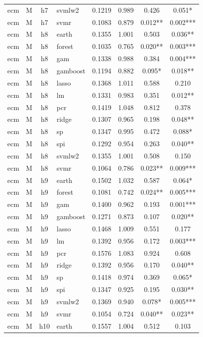 \begin{ThreePartTable}
\begin{longtable}[t]{llclcccc}
ecm & M & h7 & svmlw2 & 0.1219 & 0.989 & 0.426 & 0.051*\\
ecm & M & h7 & svmr & 0.1083 & 0.879 & 0.012** & 0.002***\\
\addlinespace
ecm & M & h8 & earth & 0.1355 & 1.001 & 0.503 & 0.036**\\
ecm & M & h8 & forest & 0.1035 & 0.765 & 0.020** & 0.003***\\
ecm & M & h8 & gam & 0.1338 & 0.988 & 0.384 & 0.004***\\
ecm & M & h8 & gamboost & 0.1194 & 0.882 & 0.095* & 0.018**\\
ecm & M & h8 & lasso & 0.1368 & 1.011 & 0.588 & 0.210\\
ecm & M & h8 & lm & 0.1331 & 0.983 & 0.351 & 0.012**\\
ecm & M & h8 & pcr & 0.1419 & 1.048 & 0.812 & 0.378\\
ecm & M & h8 & ridge & 0.1307 & 0.965 & 0.198 & 0.048**\\
ecm & M & h8 & sp & 0.1347 & 0.995 & 0.472 & 0.088*\\
ecm & M & h8 & spi & 0.1292 & 0.954 & 0.263 & 0.040**\\
ecm & M & h8 & svmlw2 & 0.1355 & 1.001 & 0.508 & 0.150\\
ecm & M & h8 & svmr & 0.1064 & 0.786 & 0.023** & 0.009***\\
\addlinespace
ecm & M & h9 & earth & 0.1502 & 1.032 & 0.587 & 0.064*\\
ecm & M & h9 & forest & 0.1081 & 0.742 & 0.024** & 0.005***\\
ecm & M & h9 & gam & 0.1400 & 0.962 & 0.193 & 0.001***\\
ecm & M & h9 & gamboost & 0.1271 & 0.873 & 0.107 & 0.020**\\
ecm & M & h9 & lasso & 0.1468 & 1.009 & 0.551 & 0.177\\
ecm & M & h9 & lm & 0.1392 & 0.956 & 0.172 & 0.003***\\
ecm & M & h9 & pcr & 0.1576 & 1.083 & 0.924 & 0.608\\
ecm & M & h9 & ridge & 0.1392 & 0.956 & 0.170 & 0.040**\\
ecm & M & h9 & sp & 0.1418 & 0.974 & 0.369 & 0.065*\\
ecm & M & h9 & spi & 0.1347 & 0.925 & 0.195 & 0.030**\\
ecm & M & h9 & svmlw2 & 0.1369 & 0.940 & 0.078* & 0.005***\\
ecm & M & h9 & svmr & 0.1054 & 0.724 & 0.040** & 0.023**\\
\addlinespace
ecm & M & h10 & earth & 0.1557 & 1.004 & 0.512 & 0.103\\

\end{longtable}
\end{ThreePartTable}
